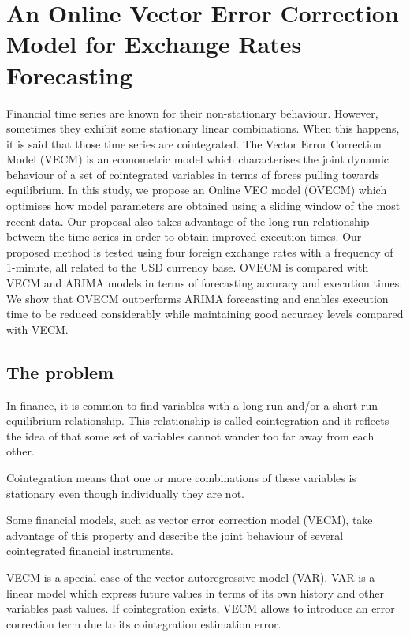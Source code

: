 
\chapter{An Online Vector Error Correction Model for Exchange Rates Forecasting}
Financial time series are known for their non-stationary behaviour. However,
sometimes they exhibit some stationary linear combinations. When this happens,
it is said that those time series are cointegrated. The Vector Error Correction
Model (VECM) is an econometric model which characterises the joint dynamic
behaviour of a set of cointegrated variables in terms of forces pulling towards
equilibrium. In this study, we propose an Online VEC model (OVECM) which
optimises how model parameters are obtained using a sliding window of the most
recent data. Our proposal also takes advantage of the long-run relationship
between the time series in order to obtain improved execution times. Our
proposed method is tested using four foreign exchange rates with a frequency of
1-minute, all related to the USD currency base. OVECM is compared with VECM and
ARIMA models in terms of forecasting accuracy and execution times. We show that
OVECM outperforms ARIMA forecasting and enables execution time to
be reduced considerably while maintaining good accuracy levels compared with
VECM.

\vspace{0.5cm} 

\section{The problem}
In finance, it is common to find variables with a long-run and/or a short-run
equilibrium relationship. This relationship is called cointegration and it
reflects the idea of that some set of variables cannot wander too far away from
each other. 

Cointegration means that one or more combinations of these variables is
stationary even though individually they are not.

Some financial models, such as  vector error correction model (VECM), take advantage of
this property and describe the joint behaviour of several cointegrated
financial instruments.

VECM is a special case of the vector autoregressive model (VAR). VAR is a linear
model which express future values in terms of its own history and other
variables past values. If cointegration exists, VECM allows to introduce an
error correction term due to its cointegration estimation error. 

